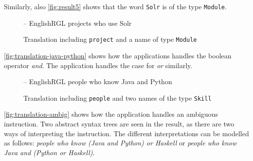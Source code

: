 Similarly, also \autoref{fig:result5} shows that the word \texttt{Solr} is of the type \texttt{Module}.

\begin{figure}[H]
\begin{terminal}
-- EnglishRGL
projects who use Solr
\end{terminal}
\begin{json-small}
\end{json-small}
\caption{Translation including \texttt{project} and a name of type \texttt{Module}\label{fig:asts-depths}}
\end{figure}

\autoref{fig:translation-java-python} shows how the applications handles the boolean operator \emph{and}. The application handles the case for \emph{or} similarly.

\begin{figure}[H]
\begin{terminal}
-- EnglishRGL
people who know Java and Python
\end{terminal}
\begin{json-small}
\end{json-small}
\caption{Translation including \texttt{people} and two names of the type \texttt{Skill}\label{fig:translation-java-python}}
\end{figure}

\autoref{fig:translation-ambig} shows how the application handles an ambiguous instruction. Two abstract syntax trees are seen in the result, as there are two ways of interpreting the instruction. The different interpretations can be modelled as follows: \emph{people who know (Java and Python) or Haskell} or \emph{people who know Java and (Python or Haskell)}.


